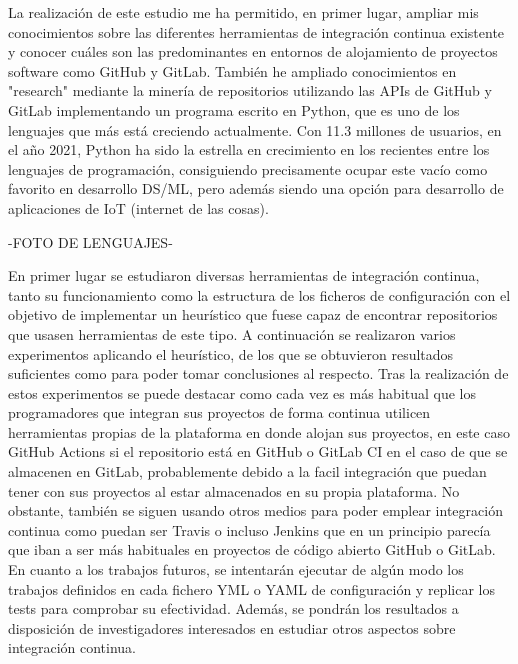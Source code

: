 La realización de este estudio me ha permitido, en primer lugar, ampliar mis conocimientos sobre las diferentes herramientas de integración continua existente y conocer cuáles son las predominantes en entornos de alojamiento de proyectos software como GitHub y GitLab.
También he ampliado conocimientos en "research" mediante la minería de repositorios utilizando las APIs de GitHub y GitLab implementando un programa escrito en Python, que es uno de los lenguajes que más está creciendo actualmente. 
Con 11.3 millones de usuarios, en el año 2021, Python ha sido la estrella en crecimiento en los recientes entre los lenguajes de programación, consiguiendo precisamente ocupar este vacío como favorito en desarrollo DS/ML, pero además siendo una opción para desarrollo de aplicaciones de IoT (internet de las cosas).

-FOTO DE LENGUAJES-

En primer lugar se estudiaron diversas herramientas de integración continua, tanto su funcionamiento como la estructura de los ficheros de configuración con el objetivo de implementar un heurístico que fuese capaz de encontrar repositorios que usasen herramientas de este tipo.
A continuación se realizaron varios experimentos aplicando el heurístico, de los que se obtuvieron resultados suficientes como para poder tomar conclusiones al respecto.
Tras la realización de estos experimentos se puede destacar como cada vez es más habitual que los programadores que integran sus proyectos de forma continua utilicen herramientas propias de la plataforma en donde alojan sus proyectos, en este caso GitHub Actions si el repositorio está en GitHub o GitLab CI en el caso de que se almacenen en GitLab, probablemente debido a la facil integración que puedan tener con sus proyectos al estar almacenados en su propia plataforma.
No obstante, también se siguen usando otros medios para poder emplear integración continua como puedan ser Travis o incluso Jenkins que en un principio parecía que iban a ser más habituales en proyectos de código abierto GitHub o GitLab.
En cuanto a los trabajos futuros, se intentarán ejecutar de algún modo los trabajos definidos en cada fichero YML o YAML de configuración y replicar los tests para comprobar su efectividad. Además, se pondrán los resultados a disposición de investigadores interesados en estudiar otros aspectos sobre integración continua.
